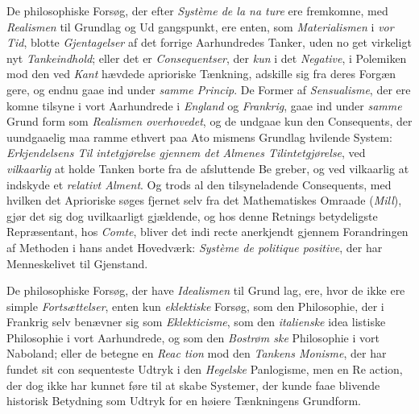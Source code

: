 De philosophiske Forsøg, der efter \emph{Système de la na\-%
ture} ere fremkomne, med \emph{Realismen} til Grundlag og Ud\-%
gangspunkt, ere enten, som \emph{Materialismen} i \emph{vor Tid}, blotte
\emph{Gjentagelser} af det forrige Aarhundredes Tanker, uden no\-%
get virkeligt nyt \emph{Tankeindhold}; eller det er \emph{Consequentser},
 der \emph{kun} i det \emph{Negative}, i Polemiken mod den ved \emph{Kant}
hævdede aprioriske Tænkning, adskille sig fra deres Forgæn\-%
gere, og endnu gaae ind under \emph{samme Princip}. De Former
af \emph{Sensualisme}, der ere komne tilsyne i vort Aarhundrede
i \emph{England} og \emph{Frankrig}, gaae ind under \emph{samme} Grund\-%
form som \emph{Realismen overhovedet}, og de undgaae kun den
Consequents, der uundgaaelig maa ramme ethvert paa Ato\-%
mismens Grundlag hvilende System: \emph{Erkjendelsens Til\-%
intetgjørelse gjennem det Almenes Tilintetgjørelse},
ved \emph{vilkaarlig} at holde Tanken borte fra de afsluttende Be\-%
greber, og ved vilkaarlig at indskyde et \emph{relativt Alment}.
Og trods al den tilsyneladende Consequents, med hvilken det
Aprioriske søges fjernet selv fra det Mathematiskes Omraade
(\emph{Mill}), gjør det sig dog uvilkaarligt gjældende, og hos denne
Retnings betydeligste Repræsentant, hos \emph{Comte}, bliver det indi\-%
recte anerkjendt gjennem Forandringen af Methoden i hans
andet Hovedværk: \emph{Système de politique positive}, der har
Menneskelivet til Gjenstand.

De philosophiske Forsøg, der have \emph{Idealismen} til Grund\-%
lag, ere, hvor de ikke ere simple \emph{Fortsættelser}, enten kun
\emph{eklektiske} Forsøg, som den Philosophie, der i Frankrig selv
benævner sig som \emph{Eklekticisme}, som den \emph{italienske} idea\-%
listiske Philosophie i vort Aarhundrede, og som den \emph{Bostrøm\-%
ske} Philosophie i vort Naboland; eller de betegne en \emph{Reac\-%
tion} mod den \emph{Tankens Monisme}, der har fundet sit con\-%
sequenteste Udtryk i den \emph{Hegelske} Panlogisme, men en Re\-%
action, der dog ikke har kunnet føre til at skabe Systemer,
der kunde faae blivende historisk Betydning som Udtryk for
en høiere Tænkningens Grundform.

